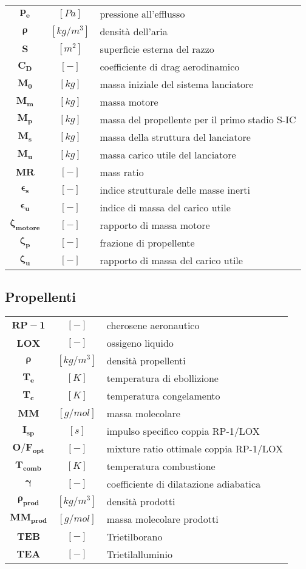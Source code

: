 \begin{multicols}{2}
\begin{tabularx}{\linewidth}{cc>{\raggedright\arraybackslash}X}
		$\bm{p_e}$ & $[Pa]$ & pressione all'efflusso \\
		$\bm{\rho}$ & $[kg/m^3]$ & densità dell'aria \\
		$\bm{S}$ & $[m^2]$ & superficie esterna del razzo \\
		$\bm{C_D}$ & $[-]$ & coefficiente di drag aerodinamico \\
        $\bm{M_0}$ & $[kg]$ & massa iniziale del sistema lanciatore \\
		$\bm{M_m}$ & $[kg]$ & massa motore \\
		$\bm{M_p}$ & $[kg]$ & massa del propellente per il primo stadio S-IC \\
                $\bm{M_s}$ & $[kg]$ & massa della struttura del lanciatore \\
		$\bm{M_u}$ & $[kg]$ & massa carico utile del lanciatore \\
                $\bm{MR}$ & $[-]$ & mass ratio \\
		$\bm{\epsilon_s}$ & $[-]$ & indice strutturale delle masse inerti \\
                $\bm{\epsilon_u}$ & $[-]$ & indice di massa del carico utile \\
		$\bm{\zeta_{motore}}$ & $[-]$ & rapporto di massa motore \\
                $\bm{\zeta_p}$ & $[-]$ & frazione di propellente \\
		$\bm{\zeta_u}$ & $[-]$ & rapporto di massa del carico utile
	\end{tabularx}

	\subsection{Propellenti}
	\begin{tabularx}{\linewidth}{cc>{\raggedright\arraybackslash}X}
		$\bm{RP-1 }$ & $[-]$ & cherosene aeronautico \\
		$\bm{LOX }$ & $[-]$ & ossigeno liquido \\
		$\bm{\rho }$ & $[kg/m^3]$ & densità propellenti \\
	    $\bm{T_{e}}$ & $[K]$ & temperatura di ebollizione \\
	    $\bm{T_{c}}$ & $[K]$ & temperatura congelamento \\
		$\bm{MM}$ & $[g/mol]$ & massa molecolare \\
	    $\bm{I_{sp}}$ & $[s]$ & impulso specifico coppia RP-1/LOX \\
	    $\bm{O/F_{opt}}$ & $[-]$ & mixture ratio ottimale coppia RP-1/LOX \\
		$\bm{T_{comb}}$ & $[K]$ & temperatura combustione \\
	    $\bm{\gamma}$ & $[-]$ & coefficiente di dilatazione adiabatica \\
	    $\bm{\rho_{prod}}$ & $[kg/m^3]$ & densità prodotti \\
		$\bm{MM_{prod}}$ & $[g/mol]$ & massa molecolare prodotti \\
	    $\bm{TEB}$ & $[-]$ & Trietilborano \\
	    $\bm{TEA}$ & $[-]$ & Trietilalluminio
	\end{tabularx}


\end{multicols}
